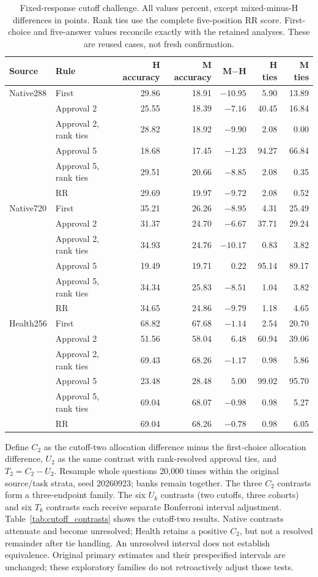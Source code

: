 \begin{table}[ht]
\centering\small
\caption{Fixed-response cutoff challenge. All values percent, except mixed-minus-H differences in points. Rank ties use the complete five-position RR score. First-choice and five-answer values reconcile exactly with the retained analyses. These are reused cases, not fresh confirmation.}
\label{tab:cutoff_absolute}
\begin{tabular}{llrrrrr}
\toprule
Source & Rule & H accuracy & M accuracy & M$-$H & H ties & M ties\\
\midrule
Native288 & First &29.86&18.91&$-10.95$&5.90&13.89\\
& Approval 2 &25.55&18.39&$-7.16$&40.45&16.84\\
& Approval 2, rank ties &28.82&18.92&$-9.90$&2.08&0.00\\
& Approval 5 &18.68&17.45&$-1.23$&94.27&66.84\\
& Approval 5, rank ties &29.51&20.66&$-8.85$&2.08&0.35\\
& RR &29.69&19.97&$-9.72$&2.08&0.52\\
\midrule
Native720 & First &35.21&26.26&$-8.95$&4.31&25.49\\
& Approval 2 &31.37&24.70&$-6.67$&37.71&29.24\\
& Approval 2, rank ties &34.93&24.76&$-10.17$&0.83&3.82\\
& Approval 5 &19.49&19.71&$0.22$&95.14&89.17\\
& Approval 5, rank ties &34.34&25.83&$-8.51$&1.04&3.82\\
& RR &34.65&24.86&$-9.79$&1.18&4.65\\
\midrule
Health256 & First &68.82&67.68&$-1.14$&2.54&20.70\\
& Approval 2 &51.56&58.04&$6.48$&60.94&39.06\\
& Approval 2, rank ties &69.43&68.26&$-1.17$&0.98&5.86\\
& Approval 5 &23.48&28.48&$5.00$&99.02&95.70\\
& Approval 5, rank ties &69.04&68.07&$-0.98$&0.98&5.27\\
& RR &69.04&68.26&$-0.78$&0.98&6.05\\
\bottomrule
\end{tabular}
\end{table}

Define $C_2$ as the cutoff-two allocation difference minus the first-choice allocation difference, $U_2$ as the same contrast with rank-resolved approval ties, and $T_2=C_2-U_2$. Resample whole questions 20,000 times within the original source/task strata, seed 20260923; banks remain together. The three $C_2$ contrasts form a three-endpoint family. The six $U_k$ contrasts (two cutoffs, three cohorts) and six $T_k$ contrasts each receive separate Bonferroni interval adjustment. Table~\ref{tab:cutoff_contrasts} shows the cutoff-two results. Native contrasts attenuate and become unresolved; Health retains a positive $C_2$, but not a resolved remainder after tie handling. An unresolved interval does not establish equivalence. Original primary estimates and their prespecified intervals are unchanged; these exploratory families do not retroactively adjust those tests.


